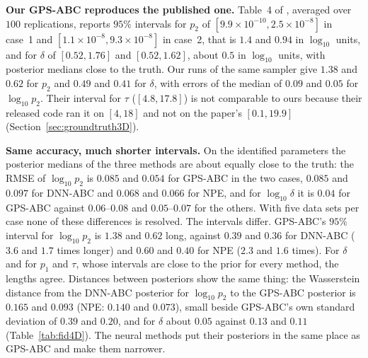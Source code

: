 \documentclass[sn-basic,iicol,pdflatex]{sn-jnl}
\begin{document}
\begin{table}[t]
\centering
\caption{Study II, paired comparison on the first five data sets of each case. GPS-ABC chains are analysed at
$2{,}000$ iterations with the first $500$ discarded; the last column is its wall-clock time for those $2{,}000$ iterations,
and for the others the time per data set (NPE: sampling only). RMSE is of the posterior median, interval length is the mean $95\%$
interval length on the $\log_{10}$ scale ($\tau$ in time units). Coverage of a single truth over five data sets takes values in steps of $0.2$.}
\label{tab:recGPS}
\small

\end{table}

\noindent\textbf{Our GPS-ABC reproduces the published one.} Table~4 of \citet{lu2023}, averaged over $100$ replications, reports $95\%$
intervals for $p_2$ of $[9.9\times10^{-10},2.5\times10^{-8}]$ in case~1 and $[1.1\times10^{-8},9.3\times10^{-8}]$ in case~2, that is
$1.4$ and $0.94$ in $\log_{10}$ units, and for $\delta$ of $[0.52,1.76]$ and $[0.52,1.62]$, about $0.5$ in $\log_{10}$ units, with
posterior medians close to the truth. Our runs of the same sampler give $1.38$ and $0.62$ for $p_2$ and $0.49$ and $0.41$
for $\delta$, with errors of the median of $0.09$ and $0.05$ for $\log_{10}p_2$. Their interval for $\tau$ ($[4.8,17.8]$) is not comparable to ours
because their released code ran it on $[4,18]$ and not on the paper's $[0.1,19.9]$ (Section~\ref{sec:groundtruth3D}).

\noindent\textbf{Same accuracy, much shorter intervals.} On the identified parameters the posterior medians of the three methods are about equally close to
the truth: the RMSE of $\log_{10}p_2$ is $0.085$ and $0.054$ for GPS-ABC in the two cases, $0.085$ and $0.097$ for DNN-ABC and $0.068$ and $0.066$
for NPE, and for $\log_{10}\delta$ it is $0.04$ for GPS-ABC against $0.06$--$0.08$ and $0.05$--$0.07$ for the others. With five data sets per case none of these differences
is resolved. The intervals differ. GPS-ABC's $95\%$ interval for $\log_{10}p_2$ is $1.38$ and $0.62$ long, against $0.39$ and $0.36$ for DNN-ABC
($3.6$ and $1.7$ times longer) and $0.60$ and $0.40$ for NPE ($2.3$ and $1.6$ times). For $\delta$ and for $p_1$ and $\tau$, whose intervals are close to the prior for every method,
the lengths agree. Distances between posteriors show the same thing: the Wasserstein distance from the DNN-ABC posterior for $\log_{10}p_2$ to the GPS-ABC posterior is
$0.165$ and $0.093$ (NPE: $0.140$ and $0.073$), small beside GPS-ABC's own standard deviation of $0.39$ and $0.20$, and for $\delta$ about $0.05$ against $0.13$ and $0.11$
(Table~\ref{tab:fid4D}). The neural methods put their posteriors in the same place as GPS-ABC and make them narrower.
\end{document}
